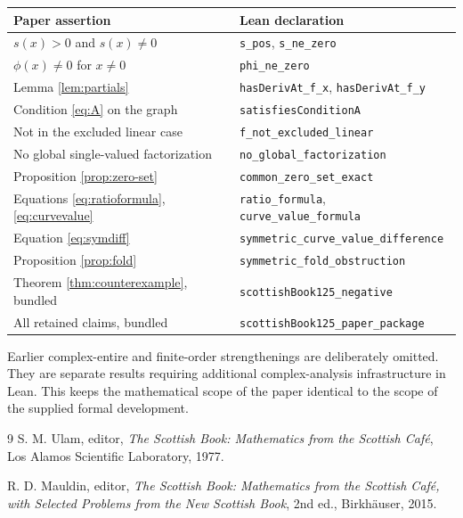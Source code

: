 \documentclass[11pt]{article}
\theoremstyle{remark}
\begin{document}
\begin{center}
\begin{tabular}{@{}ll@{}}
\toprule
Paper assertion & Lean declaration \\
\midrule
$s(x)>0$ and $s(x)\ne0$ & \texttt{s\_pos}, \texttt{s\_ne\_zero} \\
$\phi(x)\ne0$ for $x\ne0$ & \texttt{phi\_ne\_zero} \\
Lemma \ref{lem:partials} & \texttt{hasDerivAt\_f\_x}, \texttt{hasDerivAt\_f\_y} \\
Condition \eqref{eq:A} on the graph & \texttt{satisfiesConditionA} \\
Not in the excluded linear case & \texttt{f\_not\_excluded\_linear} \\
No global single-valued factorization & \texttt{no\_global\_factorization} \\
Proposition \ref{prop:zero-set} & \texttt{common\_zero\_set\_exact} \\
Equations \eqref{eq:ratioformula}, \eqref{eq:curvevalue} & \texttt{ratio\_formula}, \texttt{curve\_value\_formula} \\
Equation \eqref{eq:symdiff} & \texttt{symmetric\_curve\_value\_difference} \\
Proposition \ref{prop:fold} & \texttt{symmetric\_fold\_obstruction} \\
Theorem \ref{thm:counterexample}, bundled & \texttt{scottishBook125\_negative} \\
All retained claims, bundled & \texttt{scottishBook125\_paper\_package} \\
\bottomrule
\end{tabular}
\end{center}

Earlier complex-entire and finite-order strengthenings are deliberately omitted. They are separate results requiring additional complex-analysis infrastructure in Lean. This keeps the mathematical scope of the paper identical to the scope of the supplied formal development.

\begin{thebibliography}{9}
S. M. Ulam, editor,
\emph{The Scottish Book: Mathematics from the Scottish Caf\'e},
Los Alamos Scientific Laboratory, 1977.

R. D. Mauldin, editor,
\emph{The Scottish Book: Mathematics from the Scottish Caf\'e, with Selected Problems from the New Scottish Book},
2nd ed., Birkh\"auser, 2015.
\end{thebibliography}
\end{document}
